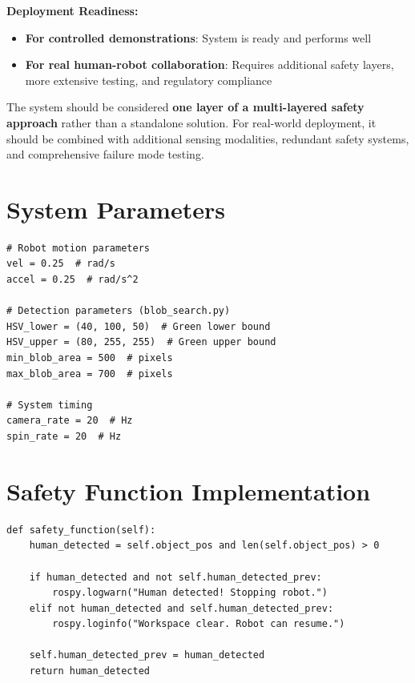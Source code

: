 \documentclass[11pt,letterpaper]{article}
\begin{document}
\textbf{Deployment Readiness:}
\begin{itemize}[leftmargin=*]
    \item \textbf{For controlled demonstrations}: System is ready and performs well
    \item \textbf{For real human-robot collaboration}: Requires additional safety layers, more extensive testing, and regulatory compliance
\end{itemize}

The system should be considered \textbf{one layer of a multi-layered safety approach} rather than a standalone solution. For real-world deployment, it should be combined with additional sensing modalities, redundant safety systems, and comprehensive failure mode testing.

\appendix

\section{System Parameters}

\begin{lstlisting}
# Robot motion parameters
vel = 0.25  # rad/s
accel = 0.25  # rad/s^2

# Detection parameters (blob_search.py)
HSV_lower = (40, 100, 50)  # Green lower bound
HSV_upper = (80, 255, 255)  # Green upper bound
min_blob_area = 500  # pixels
max_blob_area = 700  # pixels

# System timing
camera_rate = 20  # Hz
spin_rate = 20  # Hz
\end{lstlisting}

\section{Safety Function Implementation}

\begin{lstlisting}
def safety_function(self):
    human_detected = self.object_pos and len(self.object_pos) > 0
    
    if human_detected and not self.human_detected_prev:
        rospy.logwarn("Human detected! Stopping robot.")
    elif not human_detected and self.human_detected_prev:
        rospy.loginfo("Workspace clear. Robot can resume.")
    
    self.human_detected_prev = human_detected
    return human_detected
\end{lstlisting}
\end{document}
